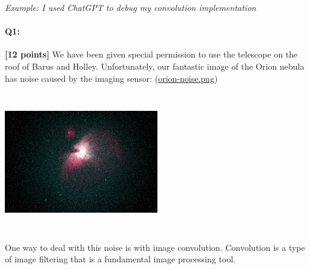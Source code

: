 \documentclass[11pt]{article}
\begin{document}
\textit{Example: I used ChatGPT to debug my convolution implementation}

\pagebreak

\paragraph{Q1:} \textbf{[12 points]} 
We have been given special permission to use the telescope on the roof of Barus and Holley. Unfortunately, our fantastic image of the Orion nebula has noise caused by the imaging sensor: (\href{run:images/orion-noise.png}{orion-noise.png})

\begin{center}
\includegraphics[width=0.5\textwidth,height=6cm,keepaspectratio]
{images/orion-noise.png}
\end{center}

One way to deal with this noise is with image convolution. 
Convolution is a type of image filtering that is a fundamental image processing tool.
\end{document}
